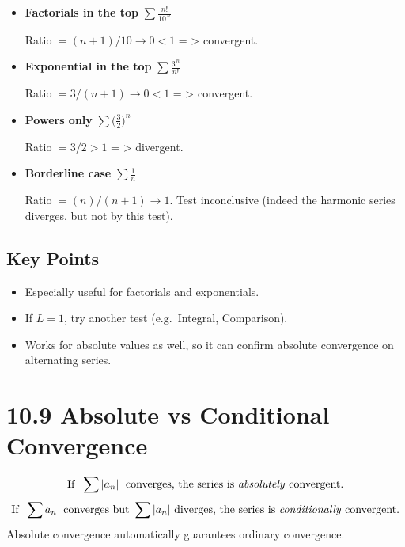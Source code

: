 \documentclass{article}
\begin{document}
\begin{itemize}[itemsep=10pt]

  \item \textbf{Factorials in the top}
        \(\displaystyle\sum \frac{n!}{10^{\,n}}\)

        Ratio \(= (n+1)/10 \rightarrow 0 < 1\) = > convergent.

  \item \textbf{Exponential in the top}
        \(\displaystyle\sum \frac{3^{\,n}}{n!}\)

        Ratio \(= 3/(n+1)\rightarrow 0 < 1\) = > convergent.

  \item \textbf{Powers only}
        \(\displaystyle\sum \bigl(\tfrac{3}{2}\bigr)^{n}\)

        Ratio \(= 3/2 > 1\) = > divergent.

  \item \textbf{Borderline case}
        \(\displaystyle\sum \frac{1}{n}\)

        Ratio \(= (n)/(n+1)\rightarrow 1\).  Test inconclusive (indeed the harmonic series diverges, but not by this test).

\end{itemize}

\subsection*{Key Points}

\begin{itemize}[itemsep=4pt]
  \item Especially useful for factorials and exponentials.
  \item If \(L=1\), try another test (e.g.\ Integral, Comparison).
  \item Works for absolute values as well, so it can confirm absolute convergence on alternating series.
\end{itemize}

\newpage
\section{10.9 Absolute vs Conditional Convergence}

\begin{tcolorbox}[colback=gray!8,colframe=black,title=Big-Idea]
\[
\text{If }\;\sum |a_n|\;\text{ converges, the series is \emph{absolutely} convergent.}
\]
\[
\text{If }\;\sum a_n\;\text{ converges but }\sum |a_n|\text{ diverges,
the series is \emph{conditionally} convergent.}
\]
Absolute convergence automatically guarantees ordinary convergence.
\end{tcolorbox}
\end{document}
